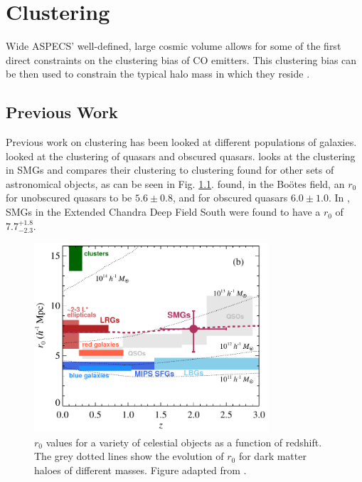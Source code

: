 \chapter{Clustering}

Wide ASPECS' well-defined, large cosmic volume allows for some of the first direct constraints on the clustering bias of CO emitters. This clustering bias can be then used to constrain the typical halo mass in which they reside \cite{10.1111/j.1365-2966.2011.20303.x}.

\section{Previous Work}

Previous work on clustering has been looked at different populations of galaxies. \cite{hickox2011clustering} looked at the clustering of quasars and obscured quasars. \cite{10.1111/j.1365-2966.2011.20303.x} looks at the clustering in SMGs and compares their clustering to clustering found for other sets of astronomical objects, as can be seen in Fig. \ref{fig:Hickox_compare}. \cite{hickox2011clustering} found, in the Bo\"otes field, an $r_0$ for unobscured quasars to be $5.6 \pm 0.8$, and for obscured quasars $6.0 \pm 1.0 $. In \cite{10.1111/j.1365-2966.2011.20303.x}, SMGs in the Extended Chandra Deep Field South were found to have a $r_0$ of $7.7_{-2.3}^{+1.8}$.

\begin{figure}[!htb]
\centering \includegraphics[width=87mm]{clustering/Hickox2012_Compare.png}
\caption{$r_0$ values for a variety of celestial objects as a function of redshift. The grey dotted lines show the evolution of $r_0$ for dark matter haloes of different masses. Figure adapted from \cite{10.1111/j.1365-2966.2011.20303.x}.}
\label{fig:Hickox_compare}
\end{figure}


